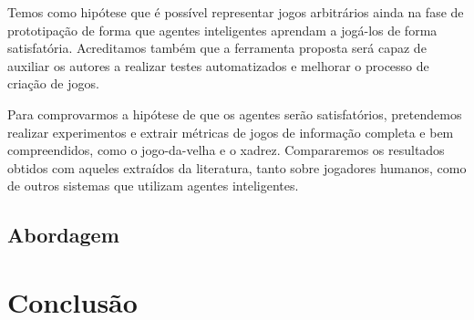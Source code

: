 \documentclass[12pt]{article}
\begin{document}
Temos como hipótese que é possível representar jogos arbitrários ainda na fase de prototipação de forma que agentes inteligentes aprendam a jogá-los de forma satisfatória.
Acreditamos também que a ferramenta proposta será capaz de auxiliar os autores a realizar testes automatizados e melhorar o processo de criação de jogos.

Para comprovarmos a hipótese de que os agentes serão satisfatórios, pretendemos realizar experimentos e extrair métricas de jogos de informação completa e bem compreendidos, como o jogo-da-velha e o xadrez.
Compararemos os resultados obtidos com aqueles extraídos da literatura, tanto sobre jogadores humanos, como de outros sistemas que utilizam agentes inteligentes.

\subsection{Abordagem}

\section{Conclusão}%
\label{sec:conclusao}


\printbibliography{}
\end{document}
